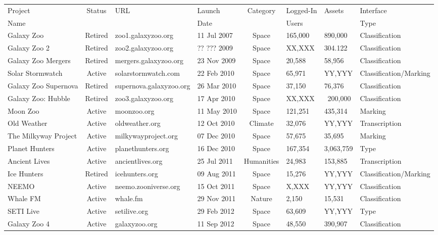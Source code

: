 \documentclass{sigchi}
\begin{document}
\begin{table}
\begin{center}
\small
\begin{tabular}{lcllclll}
\hline
Project & Status & URL & Launch & Category & Logged-In & Assets & Interface \\
Name &  &  & Date &  & Users &  &  Type \\
\hline
\hline
Galaxy Zoo & Retired & zoo1.galaxyzoo.org & 11 Jul 2007 & Space & 165,000 & 890,000 & Classification \\
\hline
Galaxy Zoo 2 & Retired & zoo2.galaxyzoo.org & ?? ??? 2009 & Space & XX,XXX & 304.122 & Classification \\
Galaxy Zoo Mergers & Retired & mergers.galaxyzoo.org & 23 Nov 2009 & Space & 20,588 & 58,956 & Classification \\
\hline
Solar Stormwatch & Active & solarstormwatch.com & 22 Feb 2010 & Space & 65,971 & YY,YYY & Classification/Marking \\
Galaxy Zoo Supernova & Retired & supernova.galaxyzoo.org & 26 Mar 2010 & Space & 37,150 & 76,376 & Classification \\
Galaxy Zoo: Hubble & Retired & zoo3.galaxyzoo.org & 17 Apr 2010 & Space & XX,XXX & ~200,000 & Classification \\
Moon Zoo & Active & moonzoo.org & 11 May 2010 & Space & 121,251 & 435,314 & Marking \\
Old Weather & Active & oldweather.org & 12 Oct 2010 & Climate & 32,076 & YY,YYY & Transcription \\
The Milkyway Project & Active & milkywayproject.org & 07 Dec 2010 & Space & 57,675 & 35,695 & Marking \\
Planet Hunters & Active & planethunters.org & 16 Dec 2010 & Space & 167,354 & 3,063,759 & Type \\
\hline
Ancient Lives & Active & ancientlives.org & 25 Jul 2011 & Humanities & 24,983 & 153,885 & Transcription \\
Ice Hunters & Retired & icehunters.org & 09 Aug 2011 & Space & 15,276 & YY,YYY & Classification/Marking \\
NEEMO & Active & neemo.zooniverse.org & 15 Oct 2011 & Space & X,XXX & YY,YYY & Classification \\
Whale FM & Active & whale.fm & 29 Nov 2011 & Nature & 2,150 & 15,531 & Classification \\
\hline
SETI Live & Active & setilive.org & 29 Feb 2012 & Space & 63,609 & YY,YYY & Type \\
Galaxy Zoo 4 & Active & galaxyzoo.org & 11 Sep 2012 & Space & 48,550 & 390,907 & Classification \\

\end{tabular}
\end{center}
\end{table}
\end{document}
